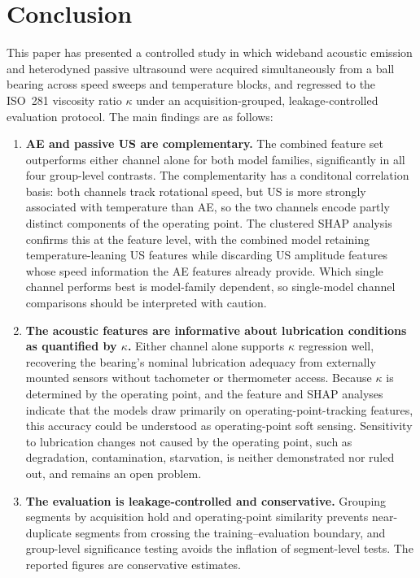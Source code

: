 \section{Conclusion}
\label{sec:conclusion}

This paper has presented a controlled study in which wideband acoustic emission and heterodyned passive ultrasound were acquired simultaneously from a ball bearing across speed sweeps and temperature blocks, and regressed to the ISO~281 viscosity ratio $\kappa$ under an acquisition-grouped, leakage-controlled evaluation protocol. The main findings are as follows:

\begin{enumerate}
  \item \textbf{AE and passive US are complementary.} The combined feature set outperforms either channel alone for both model families, significantly in all four group-level contrasts. The complementarity has a conditonal correlation basis: both channels track rotational speed, but US is more strongly associated with temperature than AE, so the two channels encode partly distinct components of the operating point. The clustered SHAP analysis confirms this at the feature level, with the combined model retaining temperature-leaning US features while discarding US amplitude features whose speed information the AE features already provide. Which single channel performs best is model-family dependent, so single-model channel comparisons should be interpreted with caution.
  \item \textbf{The acoustic features are informative about lubrication conditions as quantified by $\kappa$.} Either channel alone supports $\kappa$ regression well, recovering the bearing's nominal lubrication adequacy from externally mounted sensors without tachometer or thermometer access. Because $\kappa$ is determined by the operating point, and the feature and SHAP analyses indicate that the models draw primarily on operating-point-tracking features, this accuracy could be understood as operating-point soft sensing. Sensitivity to lubrication changes not caused by the operating point, such as degradation, contamination, starvation, is neither demonstrated nor ruled out, and remains an open problem.
  \item \textbf{The evaluation is leakage-controlled and conservative.} Grouping segments by acquisition hold and operating-point similarity prevents near-duplicate segments from crossing the training--evaluation boundary, and group-level significance testing avoids the inflation of segment-level tests. The reported figures are conservative estimates.
\end{enumerate}

